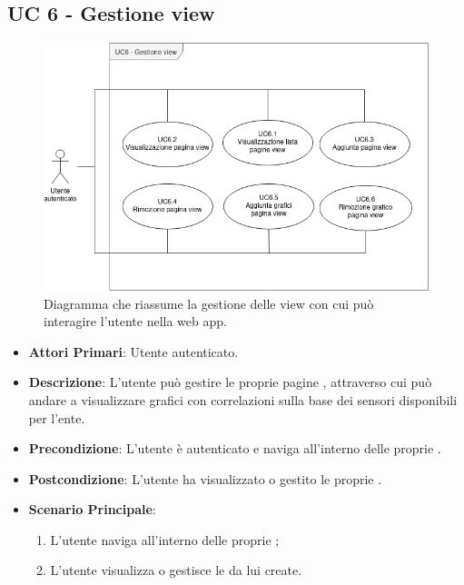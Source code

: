 	\subsection{UC 6 - Gestione view}

		\begin{figure}[H]
			\centering
			\includegraphics[scale=0.60]{res/images/uc6}
			\caption{Diagramma che riassume la gestione delle view con cui può interagire l'utente nella web app.}
		\end{figure}

		\begin{itemize}
			\item \textbf{Attori Primari}: Utente autenticato.
			\item \textbf{Descrizione}: L'utente può gestire le proprie pagine , attraverso cui può andare a visualizzare grafici con correlazioni sulla base dei sensori disponibili per l'ente.
			\item \textbf{Precondizione}: L'utente è autenticato e naviga all'interno delle proprie .
			\item \textbf{Postcondizione}: L'utente ha visualizzato o gestito le proprie .
			\item \textbf{Scenario Principale}:
			\begin{enumerate}
				\item{L'utente naviga all'interno delle proprie ;}
				\item{L'utente visualizza o gestisce le  da lui create.}
			\end{enumerate}	
		\end{itemize}


